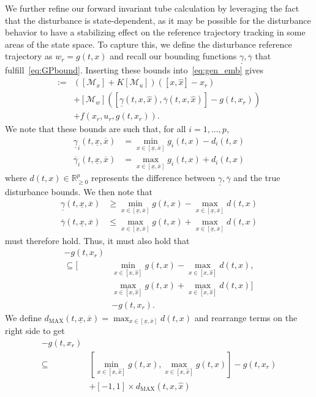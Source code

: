 \documentclass[preprint,12pt]{elsarticle}
\newcommand{\ul}{\underline}
\newcommand{\ol}{\overline}
\begin{document}
We further refine our forward invariant tube calculation by leveraging the fact that the disturbance is state-dependent, as it may be possible for the disturbance behavior to have a stabilizing effect on the reference trajectory tracking in some areas of the state space. To capture this, we define the disturbance reference trajectory as $w_r = g(t, x)$ and recall our bounding functions $\ul{\gamma}, \ol{\gamma}$ that fulfill~\eqref{eq:GPbound}. Inserting these bounds into~\eqref{eq:gen_emb} gives
\begin{align}
    [\dot{x}, \dot{\widehat{x}}] := &([\mathcal{M}_x] + K[\mathcal{M}_u])([x, \widehat{x}] - x_r) \label{eq:initial_emb_bounds}\\
    &+ [\mathcal{M}_w]([\ul{\gamma}(t, x, \widehat{x}),\ol{\gamma}(t, x, \widehat{x})] - g(t, x_r)) \nonumber\\
    &+ f(x_r, u_r, g(t, x_r)).\nonumber
\end{align}
We note that these bounds are such that, for all $i = 1, ..., p$,
\begin{align}
    \ul{\gamma}_i(t, \ul{x}, \ol{x}) &= \min_{x \in [\ul{x}, \ol{x}]}{g_i(t, x) - d_i(t, x)} \\
    \ol{\gamma}_i(t, \ul{x}, \ol{x}) &= \max_{x \in [\ul{x}, \ol{x}]}{g_i(t, x) + d_i(t, x)}
\end{align}
where $d(t, x) \in \mathbb{R}^p_{\geq 0}$ represents the difference between $\ul{\gamma}, \ol{\gamma}$ and the true disturbance bounds. We then note that
\begin{align}
    \ul{\gamma}(t, \ul{x}, \ol{x}) &\geq \min_{x \in [\ul{x}, \ol{x}]}{g(t, x)} - \max_{x \in [\ul{x}, \ol{x}]}{d(t, x)}\\
    \ol{\gamma}(t, \ul{x}, \ol{x}) &\leq \max_{x \in [\ul{x}, \ol{x}]}{g(t, x)} + \max_{x \in [\ul{x}, \ol{x}]}{d(t, x)}
\end{align}
must therefore hold. Thus, it must also hold that
\begin{align}
    [\ul{\gamma}(t, x, \widehat{x}), &\ol{\gamma}(t, x, \widehat{x})] - g(t, x_r)  \\
    \subseteq [&\min_{x \in [x, \widehat{x}]}{g(t, x)} - \max_{x \in [x, \widehat{x}]}{d(t, x)}, \nonumber\\
    &\max_{x \in [x, \widehat{x}]}{g(t, x)} + \max_{x \in [x, \widehat{x}]}{d(t, x)]}\nonumber\\
    &- g(t, x_r).\nonumber
\end{align}
We define $d_{\text{MAX}}(t, \ul{x}, \ol{x}) = \max_{x \in [\ul{x}, \ol{x}]}{d(t, x)}$ and rearrange terms on the right side to get
\begin{align}
    [\ul{\gamma}(t, x,& \widehat{x}), \ol{\gamma}(t, x, \widehat{x})] - g(t, x_r) \label{eq:dist_bounds_nomix} \\
    \subseteq &[\min_{x \in [x, \widehat{x}]}{g(t, x)}, \max_{x \in [x, \widehat{x}]}{g(t, x)}] - g(t, x_r) \nonumber\\
    &+ [-1,1] \times d_{\text{MAX}}(t, x, \widehat{x})\nonumber
\end{align}
\end{document}
